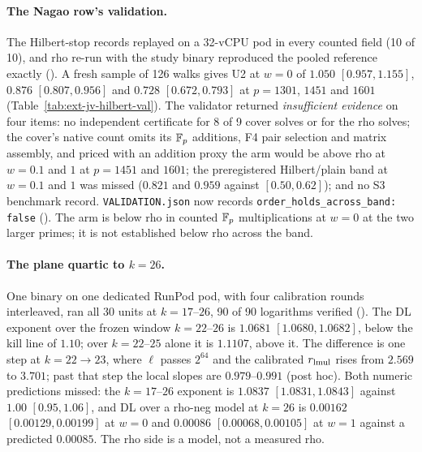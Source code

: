 \paragraph{The Nagao row's validation.} The Hilbert-stop records replayed
on a 32-vCPU pod in every counted field (10 of 10), and rho re-run with the
study binary reproduced the pooled reference exactly
(). A fresh
sample of 126 walks gives U2 at $w=0$ of $1.050$ $[0.957,1.155]$, $0.876$
$[0.807,0.956]$ and $0.728$ $[0.672,0.793]$ at $p=1301$, $1451$ and $1601$
(Table~\ref{tab:ext-jv-hilbert-val}). The validator returned
\emph{insufficient evidence} on four items: no independent certificate
for 8 of 9 cover solves or for the rho solves; the cover's native count
omits its $\mathbb{F}_p$ additions, F4 pair selection and matrix assembly, and
priced with an addition proxy the arm would be above rho at $w=0.1$ and
$1$ at $p=1451$ and $1601$; the preregistered Hilbert/plain band at
$w=0.1$ and $1$ was missed ($0.821$ and $0.959$ against $[0.50,0.62]$);
and no S3 benchmark record. \texttt{VALIDATION.json} now records
\texttt{order\_holds\_across\_band: false}
().
The arm is below rho in counted $\mathbb{F}_p$ multiplications at $w=0$ at the
two larger primes; it is not established below rho across the band.

\paragraph{The plane quartic to $k=26$.} One binary on one dedicated
RunPod pod, with four calibration rounds interleaved, ran all 30 units at
$k=17$--$26$, 90 of 90 logarithms verified
(). The
DL exponent over the frozen window $k=22$--$26$ is $1.0681$
$[1.0680,1.0682]$, below the kill line of $1.10$; over $k=22$--$25$ alone it
is $1.1107$, above it. The difference is one step at $k=22\to23$, where
$\ell$ passes $2^{64}$ and the calibrated $r_{\rm lmul}$ rises from
$2.569$ to $3.701$; past that step the local slopes are $0.979$--$0.991$
(post hoc). Both numeric predictions missed: the $k=17$--$26$ exponent is
$1.0837$ $[1.0831,1.0843]$ against $1.00$ $[0.95,1.06]$, and DL over a
rho-neg model at $k=26$ is $0.00162$ $[0.00129,0.00199]$ at $w=0$ and
$0.00086$ $[0.00068,0.00105]$ at $w=1$ against a predicted $0.00085$. The
rho side is a model, not a measured rho.

